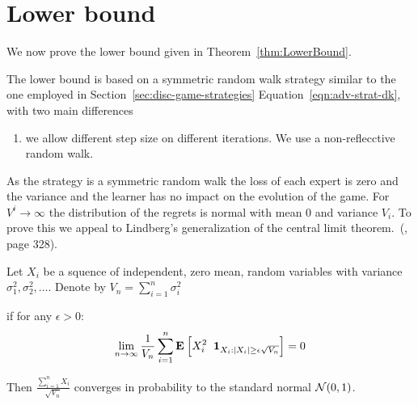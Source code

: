 \documentclass[anon,12pt]{colt2024} %
\begin{document}
\section{Lower bound} \label{sec:lowerbound}

We now prove the lower bound given in Theorem~\ref{thm:LowerBound}.

The lower bound is based on a symmetric random walk strategy similar
to the one employed in Section~\ref{sec:disc-game-strategies}
Equation~\ref{eqn:adv-strat-dk}, with two main differences
\begin{enumerate}
\item we allow different step size on different iterations. We use a non-reflecctive random walk.
\end{enumerate}

As the strategy is a symmetric random walk the loss of each expert is
zero and the variance and the learner has no impact on the evolution of the game. For
$V^i \to \infty$ the distribution of the regrets is normal with mean 0
and variance $V_i$.  To prove this we appeal to Lindberg's
generalization of the central limit theorem.~(\cite{shiryaev1989probability}, page 328).
  
  \begin{theorem}
  Let $X_i$ be a squence of independent, zero mean, random variables with variance $\sigma_1^2,\sigma_2^2,\ldots$. Denote by $V_n  = \sum_{i=1}^n \sigma_i^2$

if for any $\epsilon>0$:
  \[
    \lim_{n \to \infty} \frac{1}{V_n} \sum_{i=1}^n {\bf E}_{}\left[ X_i^2 \;\;{\bf 1}_{X_i: |X_i| \geq \epsilon \sqrt{V_n}} \right]=0
  \]

 Then $\frac{\sum_{i=1}^n X_i}{\sqrt{V_n}}$ converges in probability to the standard normal ${\cal N}(0,1)$.
\end{theorem}
\end{document}
